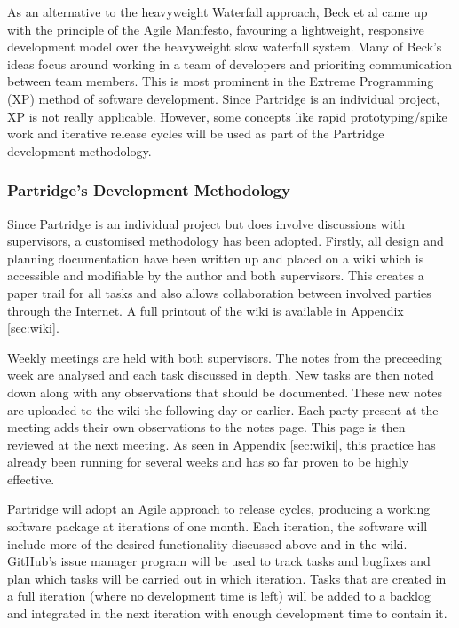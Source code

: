\documentclass[12pt,a4paper]{article}
\begin{document}
As an alternative to the heavyweight Waterfall approach, Beck et al came up
with the principle of the Agile Manifesto, favouring a lightweight, responsive
development model over the heavyweight slow waterfall
system\cite{beck2001agile}. Many of Beck's ideas focus around working in a team
of developers and prioriting communication between team members. This is most
prominent in the Extreme Programming (XP) method of software development. Since
Partridge is an individual project, XP is not really applicable. However, some
concepts like rapid prototyping/spike work and iterative release cycles will be
used as part of the Partridge development methodology.

\subsubsection{ Partridge's Development Methodology}

Since Partridge is an individual project but does involve discussions with
supervisors, a customised methodology has been adopted. Firstly, all design
and planning documentation have been written up and placed on a wiki which is
accessible and modifiable by the author and both supervisors. This creates a
paper trail for all tasks and also allows collaboration between involved
parties through the Internet. A full printout of the wiki is available in
Appendix \ref{sec:wiki}. 

Weekly meetings are held with both supervisors. The notes from the preceeding
week are analysed and each task discussed in depth. New tasks are then noted
down along with any observations that should be documented. These new notes are
uploaded to the wiki the following day or earlier. Each party present at the
meeting adds their own observations to the notes page. This page is then
reviewed at the next meeting. As seen in Appendix \ref{sec:wiki}, this practice
has already been running for several weeks and has so far proven to be highly
effective.

Partridge will adopt an Agile approach to release cycles, producing a working
software package at iterations of one month.  Each iteration, the software will
include more of the desired functionality discussed above and in the wiki.
GitHub's issue manager program will be used to track tasks and bugfixes and
plan which tasks will be carried out in which iteration. Tasks that are created
in a full iteration (where no development time is left) will be added to a
backlog and integrated in the next iteration with enough development time to
contain it.
\end{document}
